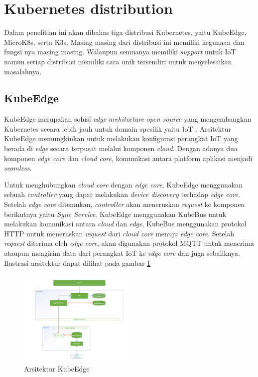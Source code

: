 \section{Kubernetes distribution}
Dalam penelitian ini akan dibahas tiga distribusi Kubernetes, yaitu KubeEdge, MicroK8s, serta K3s. Masing masing dari distribusi ini memiliki kegunaan dan fungsi nya masing masing. Walaupun semuanya memiliki \textit{support} untuk IoT namun setiap distribusi memiliki cara unik tersendiri untuk menyelesaikan masalahnya.

\subsection{KubeEdge}
KubeEdge merupakan solusi \textit{edge architecture} \textit{open source} yang mengembangkan Kubernetes secara lebih jauh untuk domain spesifik yaitu IoT \parencite{kubeedge}. Arsitektur KubeEdge memungkinkan untuk melakukan konfigurasi perangkat IoT yang berada di \textit{edge} secara terpusat melalui komponen \textit{cloud}. Dengan adanya dua komponen \textit{edge core} dan \textit{cloud core}, komunikasi antara platform aplikasi menjadi \textit{seamless}.

Untuk menghubungkan \textit{cloud core} dengan \textit{edge core}, KubeEdge menggunakan sebuah \textit{controller} yang dapat melakukan \textit{device discovery} terhadap \textit{edge core}. Setelah \textit{edge core} ditemukan, \textit{controller} akan meneruskan \textit{request} ke komponen berikutnya yaitu \textit{Sync Service}. KubeEdge menggunakan KubeBus untuk melakukan komunikasi antara \textit{cloud} dan \textit{edge}, KubeBus menggunakan protokol HTTP untuk meneruskan \textit{request} dari \textit{cloud core} menuju \textit{edge core}. Setelah \textit{request} diterima oleh \textit{edge core}, akan digunakan protokol MQTT untuk menerima ataupun mengirim data dari perangkat IoT ke \textit{edge core} dan juga sebaliknya. Ilustrasi arsitektur dapat dilihat pada gambar \ref*{fig:arsitektur-kube-edge}

\begin{figure}[ht]
  \centering
  \includegraphics[width=0.5\textwidth]{resources/chapter-2/arsitektur-kube-edge.jpg}
  \caption{Arsitektur KubeEdge \parencite{kubeedge}}
  \label{fig:arsitektur-kube-edge}
\end{figure}

